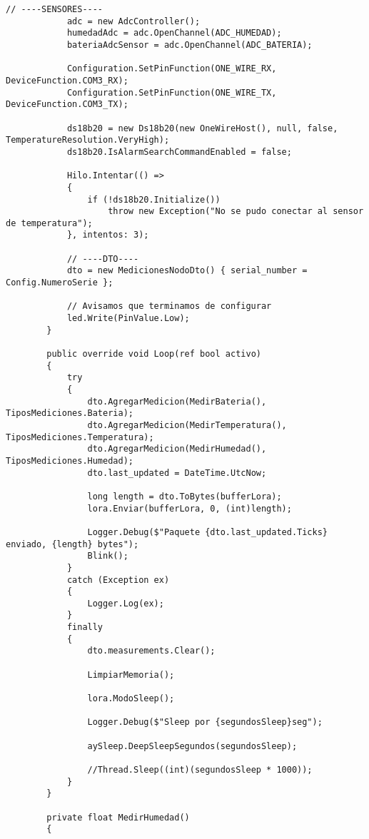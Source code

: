 \begin{lstlisting}[caption={Ejemplo de código en C\#}]
            // ----SENSORES----
            adc = new AdcController();
            humedadAdc = adc.OpenChannel(ADC_HUMEDAD);
            bateriaAdcSensor = adc.OpenChannel(ADC_BATERIA);

            Configuration.SetPinFunction(ONE_WIRE_RX, DeviceFunction.COM3_RX);
            Configuration.SetPinFunction(ONE_WIRE_TX, DeviceFunction.COM3_TX);

            ds18b20 = new Ds18b20(new OneWireHost(), null, false, TemperatureResolution.VeryHigh);
            ds18b20.IsAlarmSearchCommandEnabled = false;

            Hilo.Intentar(() =>
            {
                if (!ds18b20.Initialize())
                    throw new Exception("No se pudo conectar al sensor de temperatura");
            }, intentos: 3);

            // ----DTO----
            dto = new MedicionesNodoDto() { serial_number = Config.NumeroSerie };

            // Avisamos que terminamos de configurar
            led.Write(PinValue.Low);  
        }

        public override void Loop(ref bool activo)
        {
            try
            {
                dto.AgregarMedicion(MedirBateria(), TiposMediciones.Bateria);
                dto.AgregarMedicion(MedirTemperatura(), TiposMediciones.Temperatura);
                dto.AgregarMedicion(MedirHumedad(), TiposMediciones.Humedad);
                dto.last_updated = DateTime.UtcNow;

                long length = dto.ToBytes(bufferLora);
                lora.Enviar(bufferLora, 0, (int)length);

                Logger.Debug($"Paquete {dto.last_updated.Ticks} enviado, {length} bytes");
                Blink();
            }
            catch (Exception ex)
            {
                Logger.Log(ex);
            }
            finally
            {
                dto.measurements.Clear();

                LimpiarMemoria();

                lora.ModoSleep();

                Logger.Debug($"Sleep por {segundosSleep}seg");

                aySleep.DeepSleepSegundos(segundosSleep);

                //Thread.Sleep((int)(segundosSleep * 1000));
            }
        }

        private float MedirHumedad()
        {
            

\end{lstlisting}
